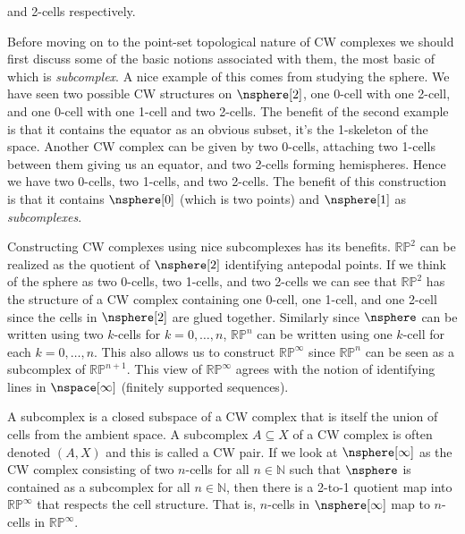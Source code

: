 \documentclass{book}                                                           %
\begin{document}
            and 2-cells respectively.
            \par\hfill\par
            Before moving on to the point-set topological nature of CW complexes
            we should first discuss some of the basic notions associated with
            them, the most basic of which is \textit{subcomplex}. A nice example
            of this comes from studying the sphere. We have seen two possible CW
            structures on $\nsphere[2]$, one 0-cell with one 2-cell, and one
            0-cell with one 1-cell and two 2-cells. The benefit of the second
            example is that it contains the equator as an obvious subset, it's
            the 1-skeleton of the space. Another CW complex can be given by
            two 0-cells, attaching two 1-cells between them giving us an
            equator, and two 2-cells forming hemispheres. Hence we have two
            0-cells, two 1-cells, and two 2-cells. The benefit of this
            construction is that it contains $\nsphere[0]$ (which is two points)
            and $\nsphere[1]$ as \textit{subcomplexes}.
            \par\hfill\par
            Constructing CW complexes using nice subcomplexes has its benefits.
            $\mathbb{RP}^{2}$ can be realized as the quotient of $\nsphere[2]$
            identifying antepodal points. If we think of the sphere as two
            0-cells, two 1-cells, and two 2-cells we can see that
            $\mathbb{RP}^{2}$ has the structure of a CW complex containing one
            0-cell, one 1-cell, and one 2-cell since the cells in $\nsphere[2]$
            are glued together. Similarly since $\nsphere$ can be written using
            two $k$-cells for $k=0,\dots,n$, $\mathbb{RP}^{n}$ can be written
            using one $k$-cell for each $k=0,\dots,n$. This also allows us to
            construct $\mathbb{RP}^{\infty}$ since $\mathbb{RP}^{n}$ can be seen
            as a subcomplex of $\mathbb{RP}^{n+1}$. This view of
            $\mathbb{RP}^{\infty}$ agrees with the notion of identifying lines
            in $\nspace[\infty]$ (finitely supported sequences).
            \par\hfill\par
            A subcomplex is a closed subspace of a CW complex that is itself the
            union of cells from the ambient space. A subcomplex $A\subseteq{X}$
            of a CW complex is often denoted $(A,X)$ and this is called a CW
            pair. If we look at $\nsphere[\infty]$ as the CW complex consisting
            of two $n$-cells for all $n\in\mathbb{N}$ such that $\nsphere$ is
            contained as a subcomplex for all $n\in\mathbb{N}$, then there is a
            2-to-1 quotient map into $\mathbb{RP}^{\infty}$ that respects the
            cell structure. That is, $n$-cells in $\nsphere[\infty]$ map to
            $n$-cells in $\mathbb{RP}^{\infty}$.
\end{document}
